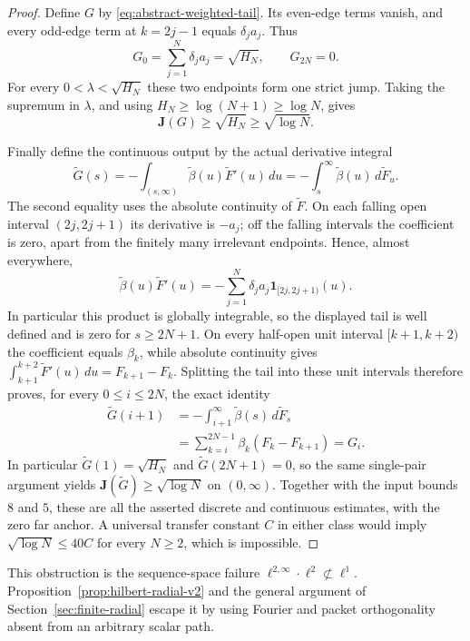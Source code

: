 \documentclass[11pt]{article}
\numberwithin{equation}{section}
\theoremstyle{remark}
\theoremstyle{definition}
\begin{document}
\begin{proof}
Define $G$ by \eqref{eq:abstract-weighted-tail}.  Its even-edge terms
vanish, and every odd-edge term at $k=2j-1$ equals $\delta_ja_j$.
Thus
\[
 G_0=\sum_{j=1}^N\delta_ja_j=\sqrt{H_N},\qquad G_{2N}=0.
\]
For every $0<\lambda<\sqrt{H_N}$ these two endpoints form one
strict jump.  Taking the supremum in $\lambda$, and using
$H_N\ge\log(N+1)\ge\log N$, gives
\[
 \mathbf J(G)\ge\sqrt{H_N}\ge\sqrt{\log N}.
\]

Finally define the continuous output by the actual derivative integral
\[
 \widetilde G(s)
 =-\int_{(s,\infty)}\widetilde\beta(u)\widetilde F'(u)\,du
 =-\int_s^\infty\widetilde\beta(u)\,d\widetilde F_u.
\]
The second equality uses the absolute continuity of $\widetilde F$.
On each falling open interval $(2j,2j+1)$ its derivative is $-a_j$;
off the falling intervals the coefficient is zero, apart from the
finitely many irrelevant endpoints.  Hence, almost everywhere,
\[
 \widetilde\beta(u)\widetilde F'(u)
 =-\sum_{j=1}^N\delta_ja_j\mathbf1_{[2j,2j+1)}(u).
\]
In particular this product is globally integrable, so the displayed
tail is well defined and is zero for $s\ge2N+1$.
On every half-open unit interval $[k+1,k+2)$ the coefficient equals
$\beta_k$, while absolute continuity gives
$\int_{k+1}^{k+2}\widetilde F'(u)\,du=F_{k+1}-F_k$.
Splitting the tail into these unit intervals therefore proves, for
every $0\le i\le2N$, the exact identity
\begin{equation}\label{eq:abstract-continuous-embedding}
 \begin{split}
 \widetilde G(i+1)
 &=-\int_{i+1}^\infty\widetilde\beta(s)\,d\widetilde F_s\\
 &=\sum_{k=i}^{2N-1}\beta_k(F_k-F_{k+1})=G_i.
 \end{split}
\end{equation}
In particular $\widetilde G(1)=\sqrt{H_N}$ and
$\widetilde G(2N+1)=0$, so the same single-pair argument yields
$\mathbf J(\widetilde G)\ge\sqrt{\log N}$ on $(0,\infty)$.
Together with the input bounds $8$ and $5$, these are all the
asserted discrete and continuous estimates, with the zero far anchor.
A universal transfer constant $C$ in either class would imply
$\sqrt{\log N}\le40C$ for every $N\ge2$, which is impossible.
\end{proof}

This obstruction is the sequence-space failure
$\ell^{2,\infty}\cdot\ell^2\not\subset\ell^1$.  Proposition~\ref{prop:hilbert-radial-v2}
and the general argument of Section~\ref{sec:finite-radial} escape it by
using Fourier and packet orthogonality absent from an arbitrary scalar path.
\end{document}
